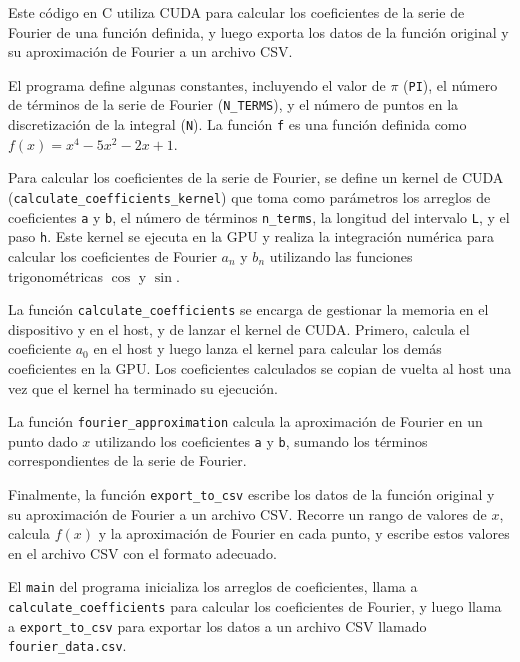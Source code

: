 Este código en C utiliza CUDA para calcular los coeficientes de la serie de Fourier de una función definida, y luego exporta los datos de la función original y su aproximación de Fourier a un archivo CSV.

El programa define algunas constantes, incluyendo el valor de \(\pi\) (\texttt{PI}), el número de términos de la serie de Fourier (\texttt{N\_TERMS}), y el número de puntos en la discretización de la integral (\texttt{N}). La función \texttt{f} es una función definida como \(f(x) = x^4 - 5x^2 - 2x + 1\).

Para calcular los coeficientes de la serie de Fourier, se define un kernel de CUDA (\texttt{calculate\_coefficients\_kernel}) que toma como parámetros los arreglos de coeficientes \texttt{a} y \texttt{b}, el número de términos \texttt{n\_terms}, la longitud del intervalo \texttt{L}, y el paso \texttt{h}. Este kernel se ejecuta en la GPU y realiza la integración numérica para calcular los coeficientes de Fourier \(a_n\) y \(b_n\) utilizando las funciones trigonométricas \(\cos\) y \(\sin\).

La función \texttt{calculate\_coefficients} se encarga de gestionar la memoria en el dispositivo y en el host, y de lanzar el kernel de CUDA. Primero, calcula el coeficiente \(a_0\) en el host y luego lanza el kernel para calcular los demás coeficientes en la GPU. Los coeficientes calculados se copian de vuelta al host una vez que el kernel ha terminado su ejecución.

La función \texttt{fourier\_approximation} calcula la aproximación de Fourier en un punto dado \(x\) utilizando los coeficientes \texttt{a} y \texttt{b}, sumando los términos correspondientes de la serie de Fourier.

Finalmente, la función \texttt{export\_to\_csv} escribe los datos de la función original y su aproximación de Fourier a un archivo CSV. Recorre un rango de valores de \(x\), calcula \(f(x)\) y la aproximación de Fourier en cada punto, y escribe estos valores en el archivo CSV con el formato adecuado.

El \texttt{main} del programa inicializa los arreglos de coeficientes, llama a \texttt{calculate\_coefficients} para calcular los coeficientes de Fourier, y luego llama a \texttt{export\_to\_csv} para exportar los datos a un archivo CSV llamado \texttt{fourier\_data.csv}.
